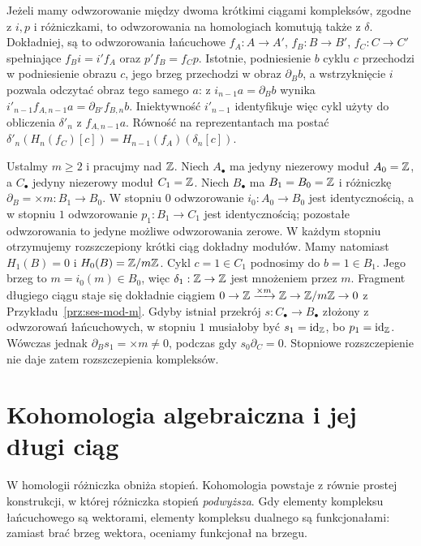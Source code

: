 \begin{uwaga}
\label{uwaga:les-naturalnosc}
Jeżeli mamy odwzorowanie między dwoma krótkimi
ciągami kompleksów, zgodne z $i,p$ i
różniczkami, to odwzorowania na homologiach
komutują także z $\delta$.
Dokładniej, są to odwzorowania łańcuchowe
$f_A:A\to A'$, $f_B:B\to B'$, $f_C:C\to C'$ spełniające
$f_Bi=i'f_A$ oraz $p'f_B=f_Cp$.
Istotnie, podniesienie $b$ cyklu $c$ przechodzi
w podniesienie obrazu $c$, jego brzeg przechodzi
w obraz $\partial_Bb$, a wstrzyknięcie $i$
pozwala odczytać obraz tego samego $a$:
z $i_{n-1}a=\partial_Bb$ wynika
$i'_{n-1}f_{A,n-1}a=\partial_{B'}f_{B,n}b$.
Iniektywność $i'_{n-1}$ identyfikuje więc
cykl użyty do obliczenia $\delta'_n$ z $f_{A,n-1}a$.
Równość na reprezentantach ma postać
$\delta'_n(H_n(f_C)[c])
=H_{n-1}(f_A)(\delta_n[c])$.
\end{uwaga}

\begin{przyklad}
\label{prz:delta-razy-m}
Ustalmy $m\geq2$ i pracujmy nad $\mathbb{Z}$.
Niech $A_\bullet$ ma jedyny niezerowy moduł
$A_0=\mathbb{Z}$, a $C_\bullet$ jedyny niezerowy
moduł $C_1=\mathbb{Z}$. Niech $B_\bullet$ ma
$B_1=B_0=\mathbb{Z}$ i różniczkę
$\partial_B=\times m:B_1\to B_0$.
W stopniu $0$ odwzorowanie $i_0:A_0\to B_0$
jest identycznością, a w stopniu $1$
odwzorowanie $p_1:B_1\to C_1$ jest identycznością;
pozostałe odwzorowania to jedyne możliwe odwzorowania zerowe.
W każdym stopniu otrzymujemy rozszczepiony
krótki ciąg dokładny modułów. Mamy natomiast
$H_1(B)=0$ i $H_0(B)=\mathbb{Z}/m\mathbb{Z}$.
Cykl $c=1\in C_1$ podnosimy do $b=1\in B_1$.
Jego brzeg to $m=i_0(m)\in B_0$,
więc $\delta_1:\mathbb{Z}\to\mathbb{Z}$ jest mnożeniem przez $m$.
Fragment długiego ciągu staje się dokładnie
ciągiem $0\to\mathbb{Z}\xrightarrow{\times m}\mathbb{Z}
\to\mathbb{Z}/m\mathbb{Z}\to0$ z Przykładu~\ref{prz:ses-mod-m}.
Gdyby istniał przekrój $s:C_\bullet\to B_\bullet$
złożony z odwzorowań łańcuchowych, w stopniu $1$
musiałoby być $s_1=\mathrm{id}_{\mathbb{Z}}$, bo $p_1=\mathrm{id}_{\mathbb{Z}}$.
Wówczas jednak $\partial_Bs_1=\times m\ne0$,
podczas gdy $s_0\partial_C=0$.
Stopniowe rozszczepienie nie daje zatem
rozszczepienia kompleksów.
\end{przyklad}
\section{Kohomologia algebraiczna i jej długi ciąg}
\label{sec:kohomologia-algebraiczna}

W homologii różniczka obniża stopień.
Kohomologia powstaje z równie prostej
konstrukcji, w której różniczka stopień
\emph{podwyższa}. Gdy elementy kompleksu
łańcuchowego są wektorami, elementy
kompleksu dualnego są funkcjonałami:
zamiast brać brzeg wektora, oceniamy
funkcjonał na brzegu.

